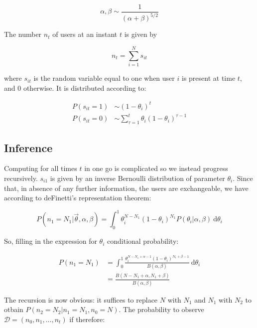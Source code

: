\documentclass{tufte-book}
\begin{document}
\begin{equation}
  \alpha, \beta \sim \frac{1}{\left(\alpha+\beta\right)^{5/2}}
\end{equation}


The number $n_t$ of users at an instant $t$ is given by

\begin{equation}
  n_t = \sum_{i=1}^N s_{it}
\end{equation}

where $s_{it}$ is the random variable equal to one when user $i$ is present at time $t$, and $0$ otherwise. It
is distributed according to:

\begin{align*}
  P(s_{it}=1) &\sim \left(1-\theta_i\right)^t\\
  P(s_{it}=0) &\sim \sum_{\tau=1}^t \theta_i \left(1-\theta_i\right)^{\tau-1}
\end{align*}

    \subsection{Inference}%
    \label{sub:inference}

Computing for all times $t$ in one go is complicated so we instead progress recursively. $s_{i1}$ is given by an
inverse Bernoulli distribution of parameter $\theta_i$. Since that, in absence of any further information, the
users are exchangeable, we have according to deFinetti's representation theorem:

\begin{equation}
  P(n_1 = N_1 | \vec{\theta}, \alpha, \beta) = \int_0^1 \theta_i^{N-N_1} \left(1-\theta_i\right)^{N_1}
  P(\theta_i|\alpha, \beta)\: \mathrm{d}\theta_i
\end{equation}

So, filling in the expression for $\theta_i$ conditional probability:

\begin{align}
  P(n_1=N_1) &= \int_0^1 \frac{\theta_i^{N-N_1+\alpha-1}\left(1-\theta_i\right)^{N_1+\beta-1}}{B(\alpha,
  \beta)}\:\mathrm{d}\theta_i \nonumber\\
  &= \frac{B(N-N_1+\alpha, N_1+\beta)}{B(\alpha, \beta)}
\label{sbg:recursion-formula}
\end{align}

The recursion is now obvious: it suffices to replace $N$ with $N_1$ and $N_1$ with $N_2$ to otbain
$P(n_2=N_2|n_1=N_1, n_0=N)$. The probability to observe $
\mathcal{D} = \left(n_0, n_1, \dots, n_t\right)$ if therefore:
\end{document}
